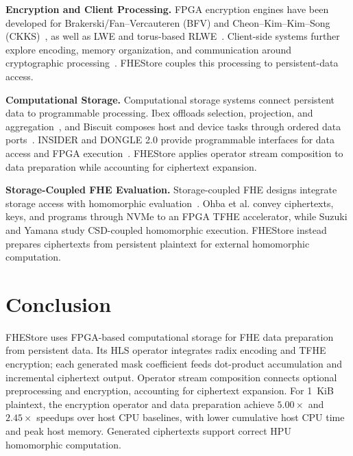 \documentclass[sigconf,anonymous,balance=false]{acmart}
\newcommand{\bodypar}{\par\vskip 0pt plus 6pt\relax}
\begin{document}
\noindent\textbf{Encryption and Client Processing.}
FPGA encryption engines have been developed for Brakerski/Fan--Vercauteren (BFV) and Cheon--Kim--Kim--Song (CKKS)~\cite{mert2020bfv,lee2023ckks}, as well as LWE and torus-based RLWE~\cite{feryputri2025lwe,syafalni2026multicore}. Client-side systems further explore encoding, memory organization, and communication around cryptographic processing~\cite{krieger2024aloha,yune2025abcfhe,vanderhagen2022choco,gupta2024memfhe}. FHEStore couples this processing to persistent-data access.
\bodypar

\noindent\textbf{Computational Storage.}
Computational storage systems connect persistent data to programmable processing. Ibex offloads selection, projection, and aggregation~\cite{woods2014ibex}, and Biscuit composes host and device tasks through ordered data ports~\cite{gu2016biscuit}. INSIDER and DONGLE 2.0 provide programmable interfaces for data access and FPGA execution~\cite{ruan2019insider,wong2024dongle}. FHEStore applies operator stream composition to data preparation while accounting for ciphertext expansion.
\bodypar

\noindent\textbf{Storage-Coupled FHE Evaluation.}
Storage-coupled FHE designs integrate storage access with homomorphic evaluation~\cite{ohba2025nvme,suzuki2023isc}. Ohba et al. convey ciphertexts, keys, and programs through NVMe to an FPGA TFHE accelerator, while Suzuki and Yamana study CSD-coupled homomorphic execution. FHEStore instead prepares ciphertexts from persistent plaintext for external homomorphic computation.

\section{Conclusion}
\label{sec:conclusion}
FHEStore uses FPGA-based computational storage for FHE data preparation from persistent data. Its HLS operator integrates radix encoding and TFHE encryption; each generated mask coefficient feeds dot-product accumulation and incremental ciphertext output. Operator stream composition connects optional preprocessing and encryption, accounting for ciphertext expansion. For 1~KiB plaintext, the encryption operator and data preparation achieve $5.00\times$ and $2.45\times$ speedups over host CPU baselines, with lower cumulative host CPU time and peak host memory. Generated ciphertexts support correct HPU homomorphic computation.




\end{document}
